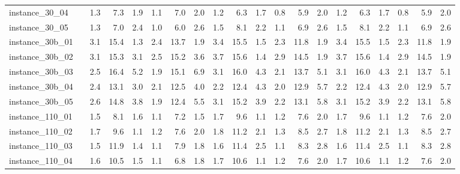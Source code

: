 \documentclass[12pt,a4paper,openright,twoside]{book}
\begin{document}
\begin{table}[H]
{\begin{tabular}{|ll|rrrrrr|rrrrrr|rrrrrr|}
instance\_30\_04              &     &    1.3  &   7.3  &  1.9  &   1.1  &   7.0  &  2.0  &      1.2  &   6.3  &  1.7  &   0.8  &   5.9  &  2.0  &       1.2  &   6.3  &  1.7  &   0.8  &   5.9  &  2.0   \\   
instance\_30\_05              &     &    1.3  &   7.0  &  2.4  &   1.0  &   6.0  &  2.6  &      1.5  &   8.1  &  2.2  &   1.1  &   6.9  &  2.6  &       1.5  &   8.1  &  2.2  &   1.1  &   6.9  &  2.6   \\ 
instance\_30b\_01              &     &    3.1  &   15.4  &  1.3  &   2.4  &   13.7  &  1.9  &    3.4  &   15.5  &  1.5  &   2.3  &   11.8  &  1.9  &     3.4  &   15.5  &  1.5  &   2.3  &   11.8  &  1.9   \\          
instance\_30b\_02              &     &    3.1  &   15.3  &  3.1  &   2.5  &   15.2  &  3.6  &    3.7  &   15.6  &  1.4  &   2.9  &   14.5  &  1.9  &     3.7  &   15.6  &  1.4  &   2.9  &   14.5  &  1.9   \\           
instance\_30b\_03              &     &    2.5  &   16.4  &  5.2  &   1.9  &   15.1  &  6.9  &    3.1  &   16.0  &  4.3  &   2.1  &   13.7  &  5.1  &     3.1  &   16.0  &  4.3  &   2.1  &   13.7  &  5.1   \\           
instance\_30b\_04              &     &   2.4  &   13.1  &  3.0  &   2.1  &   12.5  &  4.0  &     2.2  &   12.4  &  4.3  &   2.0  &   12.9  &  5.7  &     2.2  &   12.4  &  4.3  &   2.0  &   12.9  &  5.7   \\            
instance\_30b\_05              &     &    2.6  &   14.8  &  3.8  &   1.9  &   12.4  &  5.5  &    3.1  &   15.2  &  3.9  &   2.2  &   13.1  &  5.8  &     3.1  &   15.2  &  3.9  &   2.2  &   13.1  &  5.8   \\           
instance\_110\_01             &     &     1.5  &   8.1  &  1.6  &   1.1  &   7.2  &  1.5  &     1.7  &   9.6  &  1.1  &   1.2  &   7.6  &  2.0  &       1.7  &   9.6  &  1.1  &   1.2  &   7.6  &  2.0   \\           
instance\_110\_02             &     &    1.7  &   9.6  &  1.1  &   1.2  &   7.6  &  2.0  &      1.8  &   11.2  &  2.1  &   1.3  &   8.5  &  2.7  &      1.8  &   11.2  &  2.1  &   1.3  &   8.5  &  2.7   \\           
instance\_110\_03             &     &    1.5  &   11.9  &  1.4  &   1.1  &   7.9  &  1.8  &     1.6  &   11.4  &  2.5  &   1.1  &   8.3  &  2.8  &      1.6  &   11.4  &  2.5  &   1.1  &   8.3  &  2.8   \\           
instance\_110\_04             &     &    1.6  &   10.5  &  1.5  &   1.1  &   6.8  &  1.8  &     1.7  &   10.6  &  1.1  &   1.2  &   7.6  &  2.0  &      1.7  &   10.6  &  1.1  &   1.2  &   7.6  &  2.0   \\           

\end{tabular}}
\end{table}
\end{document}
